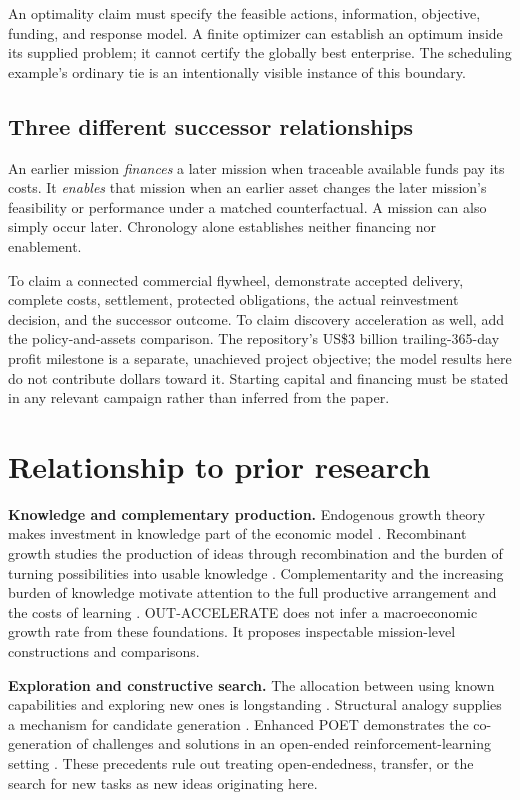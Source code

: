 \documentclass[11pt,letterpaper]{article}
\theoremstyle{remark}\newtheorem{remark}{Remark}[section]
\newcommand{\oa}{{\sffamily OUT-ACCELERATE}}
\begin{document}
An optimality claim must specify the feasible actions, information, objective, funding, and response model.
A finite optimizer can establish an optimum inside its supplied problem; it cannot certify the globally best enterprise.
The scheduling example's ordinary tie is an intentionally visible instance of this boundary.

\subsection{Three different successor relationships}
An earlier mission \emph{finances} a later mission when traceable available funds pay its costs.
It \emph{enables} that mission when an earlier asset changes the later mission's feasibility or performance under a matched counterfactual.
A mission can also simply occur later.
Chronology alone establishes neither financing nor enablement.

To claim a connected commercial flywheel, demonstrate accepted delivery, complete costs, settlement, protected obligations, the actual reinvestment decision, and the successor outcome.
To claim discovery acceleration as well, add the policy-and-assets comparison.
The repository's US\$3 billion trailing-365-day profit milestone is a separate, unachieved project objective; the model results here do not contribute dollars toward it.
Starting capital and financing must be stated in any relevant campaign rather than inferred from the paper.

\section{Relationship to prior research}\label{sec:related}

\textbf{Knowledge and complementary production.}
Endogenous growth theory makes investment in knowledge part of the economic model \citep{romer1990}.
Recombinant growth studies the production of ideas through recombination and the burden of turning possibilities into usable knowledge \citep{weitzman1998}.
Complementarity and the increasing burden of knowledge motivate attention to the full productive arrangement and the costs of learning \citep{kremer1993,jones2009}.
\oa{} does not infer a macroeconomic growth rate from these foundations.
It proposes inspectable mission-level constructions and comparisons.

\textbf{Exploration and constructive search.}
The allocation between using known capabilities and exploring new ones is longstanding \citep{march1991}.
Structural analogy supplies a mechanism for candidate generation \citep{gentner1983,gickholyoak1980}.
Enhanced POET demonstrates the co-generation of challenges and solutions in an open-ended reinforcement-learning setting \citep{wang2020poet}.
These precedents rule out treating open-endedness, transfer, or the search for new tasks as new ideas originating here.
\end{document}
